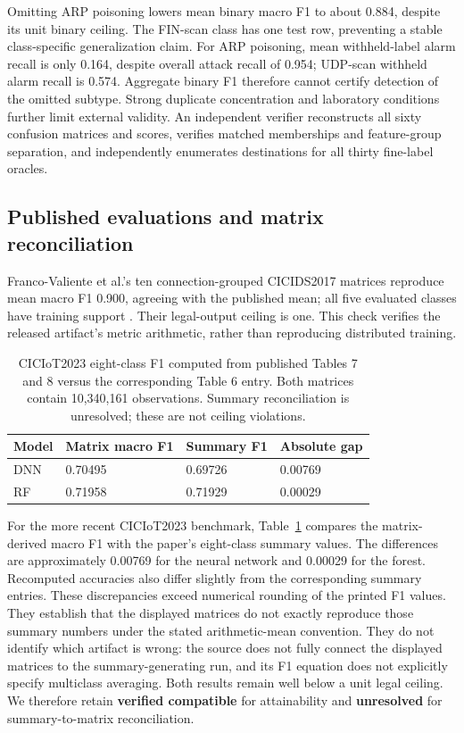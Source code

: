 \documentclass[twocolumn]{svjour3}
\begin{document}
Omitting ARP poisoning lowers mean binary macro F1 to about 0.884, despite its unit binary ceiling. The FIN-scan class has one test row, preventing a stable class-specific generalization claim. For ARP poisoning, mean withheld-label alarm recall is only 0.164, despite overall attack recall of 0.954; UDP-scan withheld alarm recall is 0.574. Aggregate binary F1 therefore cannot certify detection of the omitted subtype. Strong duplicate concentration and laboratory conditions further limit external validity. An independent verifier reconstructs all sixty confusion matrices and scores, verifies matched memberships and feature-group separation, and independently enumerates destinations for all thirty fine-label oracles.

\subsection{Published evaluations and matrix reconciliation}
Franco-Valiente et al.'s ten connection-grouped CICIDS2017 matrices reproduce mean macro F1 0.900, agreeing with the published mean; all five evaluated classes have training support \cite{francovaliente2026}. Their legal-output ceiling is one. This check verifies the released artifact's metric arithmetic, rather than reproducing distributed training.

\begin{table}[t]
\caption{CICIoT2023 eight-class F1 computed from published Tables 7 and 8 versus the corresponding Table 6 entry. Both matrices contain 10,340,161 observations. Summary reconciliation is unresolved; these are not ceiling violations.}\label{tab-external}
\centering\small
\begin{tabular}{llll}\toprule
Model & Matrix macro F1 & Summary F1 & Absolute gap\\
\midrule
DNN & 0.70495 & 0.69726 & 0.00769\\
RF & 0.71958 & 0.71929 & 0.00029\\
\bottomrule\end{tabular}
\end{table}


For the more recent CICIoT2023 benchmark, Table~\ref{tab-external} compares the matrix-derived macro F1 with the paper's eight-class summary values. The differences are approximately 0.00769 for the neural network and 0.00029 for the forest. Recomputed accuracies also differ slightly from the corresponding summary entries. These discrepancies exceed numerical rounding of the printed F1 values. They establish that the displayed matrices do not exactly reproduce those summary numbers under the stated arithmetic-mean convention. They do not identify which artifact is wrong: the source does not fully connect the displayed matrices to the summary-generating run, and its F1 equation does not explicitly specify multiclass averaging. Both results remain well below a unit legal ceiling. We therefore retain \textbf{verified compatible} for attainability and \textbf{unresolved} for summary-to-matrix reconciliation.
\end{document}
